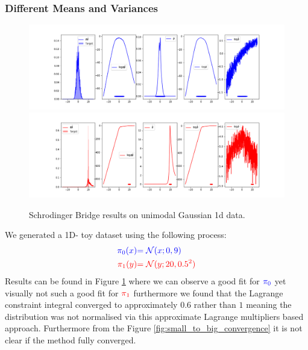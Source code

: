 \documentclass[a4paper,12pt,twoside,openright]{report}
\theoremstyle{definition}
\begin{document}
\subsubsection{Different Means and Variances}
\begin{figure}
    \centering
    \includegraphics[scale=0.45,trim={4.3cm 0.2cm 1.5cm 0}, clip]{images/Pavon/Forward_bigvar_test_working.png}\\\vspace{-0.2cm}
    \includegraphics[scale=0.45,trim={4.3cm 0 1.5cm 1.5cm}, clip]{images/Pavon/Backward_bigvar_test_working.png} 
    \caption{Schrodinger Bridge results on unimodal Gaussian 1d data. }
    \label{fig:small_to_big}
\end{figure}
We generated a 1D- toy dataset using the following process:
\begin{align*}
     \color{blue}{\pi_0(x)} &\color{blue}{= {\mathcal{N}}(x; 0,  9)} \\
    \color{red}{\pi_1(y)} &\color{red}{= {\mathcal{N}}(y; 20, 0.5 ^2)} 
\end{align*}
Results can be found in Figure \ref{fig:small_to_big} where we can observe a good fit for $\color{blue}{\pi_0}$ yet visually not such a good fit for $\color{red}{\pi_1}$ furthermore we found that the Lagrange constraint integral converged to approximately $0.6$ rather than $1$ meaning the distribution was not normalised via this approximate Lagrange multipliers based approach. Furthermore from the Figure \ref{fig:small_to_big_convergence} it is not clear if the method fully converged. 
\end{document}

